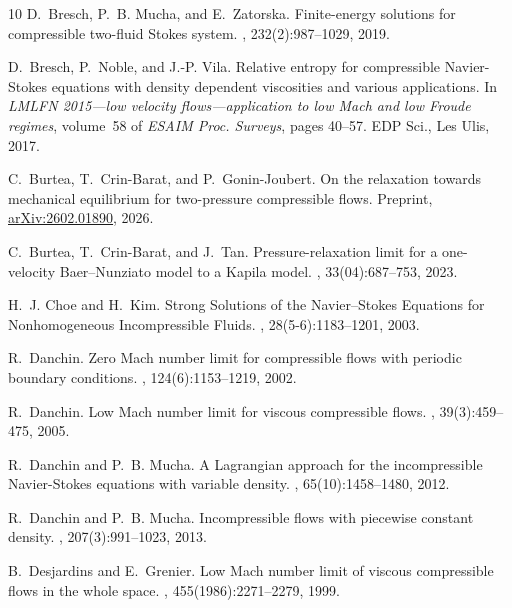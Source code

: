 \documentclass[11pt, twoside, a4paper]{article}
\theoremstyle{plain}
\theoremstyle{remark}
\numberwithin{equation}{section}
\begin{document}
\begin{thebibliography}{10}
D.~Bresch, P.~B. Mucha, and E.~Zatorska.
\newblock Finite-energy solutions for compressible two-fluid {S}tokes system.
, 232(2):987--1029, 2019.

D.~Bresch, P.~Noble, and J.-P. Vila.
\newblock Relative entropy for compressible {N}avier-{S}tokes equations with
  density dependent viscosities and various applications.
\newblock In {\em L{MLFN} 2015---low velocity flows---application to low {M}ach
  and low {F}roude regimes}, volume~58 of {\em ESAIM Proc. Surveys}, pages
  40--57. EDP Sci., Les Ulis, 2017.

C.~Burtea, T.~Crin-Barat, and P.~Gonin-Joubert.
\newblock On the relaxation towards mechanical equilibrium for two-pressure
  compressible flows.
\newblock Preprint, \href{https://arxiv.org/abs/2602.01890}{arXiv:2602.01890},
  2026.

C.~Burtea, T.~Crin-Barat, and J.~Tan.
\newblock Pressure-relaxation limit for a one-velocity {B}aer--{N}unziato model
  to a {K}apila model.
, 33(04):687--753, 2023.

H.~J. Choe and H.~Kim.
\newblock Strong {S}olutions of the {N}avier--{S}tokes {E}quations for
  {N}onhomogeneous {I}ncompressible {F}luids.
, 28(5-6):1183--1201, 2003.

R.~Danchin.
\newblock Zero {M}ach number limit for compressible flows with periodic
  boundary conditions.
, 124(6):1153--1219, 2002.

R.~Danchin.
\newblock Low {M}ach number limit for viscous compressible flows.
, 39(3):459--475, 2005.

R.~Danchin and P.~B. Mucha.
\newblock A {L}agrangian approach for the incompressible {N}avier-{S}tokes
  equations with variable density.
, 65(10):1458--1480, 2012.

R.~Danchin and P.~B. Mucha.
\newblock Incompressible flows with piecewise constant density.
, 207(3):991--1023, 2013.

B.~Desjardins and E.~Grenier.
\newblock Low {M}ach number limit of viscous compressible flows in the whole
  space.
,
  455(1986):2271--2279, 1999.


\end{thebibliography}
\end{document}
